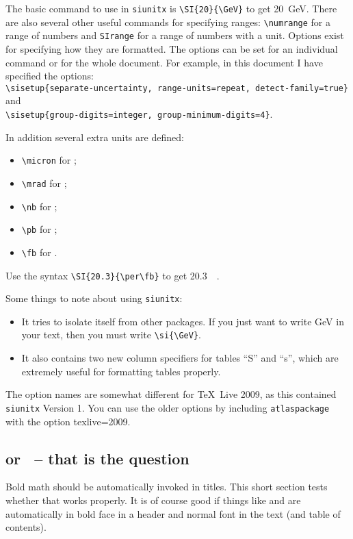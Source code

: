 \documentclass[atlasstyle,UKenglish]{latex/atlasdoc}
\newcommand{\Option}[1]{\textsf{#1}\xspace}
\newcommand{\Package}[1]{\texttt{#1}\xspace}
\begin{document}
The basic command to use in \Package{siunitx} is \verb|\SI{20}{\GeV}| to get
\SI{20}{\GeV}. 
There are also several other useful commands for specifying ranges:
\verb|\numrange| for a range of numbers and \verb|SIrange| for a range of numbers with a unit. 
Options exist for specifying how they are formatted.
The options can be set for an individual command or for the whole document.
For example, in this document I have specified the options:\\
\verb|\sisetup{separate-uncertainty, range-units=repeat, detect-family=true}|
and\\
\verb|\sisetup{group-digits=integer, group-minimum-digits=4}|.

In addition several extra units are defined:
\begin{itemize}
\item \verb|\micron| for \si{\micron};
\item \verb|\mrad| for \si{\mrad};
\item \verb|\nb| for \si{\nb};
\item \verb|\pb| for \si{\pb};
\item \verb|\fb| for \si{\fb}.
\end{itemize}
Use the syntax \verb|\SI{20.3}{\per\fb}| to get \SI{20.3}{\per\fb}.

Some things to note about using \Package{siunitx}:
\begin{itemize}
\item It tries to isolate itself from other packages.
  If you just want to write \si{\GeV} in your text,
  then you must write \verb|\si{\GeV}|.
\item It also contains two new column specifiers for tables ``S'' and ``s'',
  which are extremely useful for formatting tables properly.
\end{itemize}

The option names are somewhat different for \TeX\ Live 2009,
as this contained \Package{siunitx} Version 1.
You can use the older options by including \Package{atlaspackage} with the 
option \Option{texlive=2009}.


\subsection{\pT or \ET\ -- that is the question}

Bold math should be automatically invoked in titles.
This short section tests whether that works properly.
It is of course good if things like \pT and \ET are automatically in bold face in
a header and normal font in the text (and table of contents).
\end{document}
